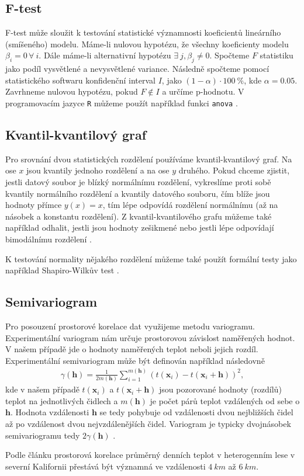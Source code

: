 \subsection{F-test}
F-test může sloužit k testování statistické významnosti koeficientů lineárního (smíšeného) modelu. Máme-li nulovou hypotézu, že všechny koeficienty modelu $\beta_i = 0\, \forall\ i$. Dále máme-li alternativní hypotézu $\exists\ j, \beta_j\neq 0$. Spočteme $F$ statistiku jako podíl vysvětlené a nevysvětlené variance. Následně spočteme pomocí statistického softwaru konfidenční interval $I$, jako $(1-\alpha)\cdot\SI{100}{\%}$, kde $\alpha = 0.05$. Zavrhneme nulovou hypotézu, pokud $F\notin I$ a určíme p-hodnotu. V programovacím jazyce \texttt{R} můžeme použít například funkci \texttt{anova} \parencite{ftest}.

\subsection{Kvantil-kvantilový graf}
Pro srovnání dvou statistických rozdělení používáme kvantil-kvantilový graf. Na ose $x$ jsou kvantily jednoho rozdělení a na ose $y$ druhého. Pokud chceme zjistit, jestli datový soubor je blízký normálnímu rozdělení, vykreslíme proti sobě kvantily normálního rozdělení a kvantily datového souboru, čím blíže jsou hodnoty přímce $y(x)=x$, tím lépe odpovídá rozdělení normálnímu (až na násobek a konstantu rozdělení). Z kvantil-kvantilového grafu můžeme také například odhalit, jestli jsou hodnoty zešikmené nebo jestli lépe odpovídají bimodálnímu rozdělení \parencite{interpretqqplot}.

K testování normality nějakého rozdělení můžeme také použít formální testy jako například Shapiro-Wilkův test \parencite{KozakM2018WnaR}.%

\subsection{Semivariogram}\label{chap:variogram}
Pro posouzení prostorové korelace dat využijeme metodu variogramu. Experimentální variogram nám určuje prostorovou závislost naměřených hodnot. V našem případě jde o hodnoty naměřených teplot neboli jejich rozdíl. Experimentální semivariogram může být definován například následovně
\begin{gather*}
	\gamma(\mathbf{h}) = \frac{1}{2m(\mathbf{h})}\sum_{i=1}^{m(\mathbf{h})}\left(t(\mathbf{x}_i) - t(\mathbf{x}_i+\mathbf{h})\right)^2,
\end{gather*}
kde v našem případě $t(\mathbf{x}_i)$ a $t(\mathbf{x}_i+\mathbf{h})$ jsou pozorované hodnoty (rozdílů) teplot na jednotlivých čidlech a $m(\mathbf{h})$ je počet párů teplot vzdálených od sebe o $\mathbf{h}$. Hodnota vzdálenosti $\mathbf{h}$ se tedy pohybuje od vzdálenosti dvou nejbližších čidel až po vzdálenost dvou nejvzdálenějších čidel. Variogram je typicky dvojnásobek semivariogramu tedy $2\gamma(\mathbf{h})$ \parencite{variogram}.

Podle článku \parencite{predictingforestmicroclimate} prostorová korelace průměrný denních teplot v heterogenním lese v severní Kalifornii přestává být významná ve vzdálenosti $\SI{4}{km}$ až $\SI{6}{km}$.
